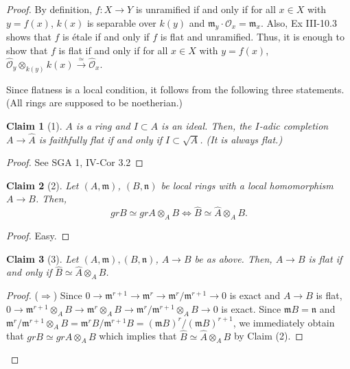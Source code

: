 \documentclass[11pt]{amsart}          %
\newcommand{\calO}{\mathcal{O}}
\newtheorem*{claim}{Claim}
\begin{document}
\begin{proof}By definition, $f : X \to Y$ is unramified if and only if for all $x \in X$ with $y = f(x)$, $k(x)$ is separable over $k(y)$ and $\mathfrak{m}_y \cdot \calO_x = \mathfrak{m}_x$. Also, Ex III-10.3 shows that $f$ is \'etale if and only if $f$ is flat and unramified. Thus, it is enough to show that $f$ is flat if and only if for all $x \in X$ with $ y = f(x)$, $\widehat{\calO}_y \otimes_{k(y)} k(x) \overset{\simeq}{\to} \widehat{\calO}_x.$

Since flatness is a local condition, it follows from the following three statements. (All rings are supposed to be noetherian.)

\begin{claim}[1]$A$ is a ring and $I \subset A$ is an ideal. Then, the $I$-adic completion $A \to \widehat{A}$ is faithfully flat if and only if $I \subset \sqrt{A}$. (It is always flat.)
\end{claim}

\begin{proof}See SGA 1, IV-Cor 3.2
\end{proof}

\begin{claim}[2]Let $(A, \mathfrak{m})$, $(B, \mathfrak{n})$ be local rings with a local homomorphism $A \to B$. Then, 
$$gr B \simeq gr A \otimes_A B \Leftrightarrow \widehat{B} \simeq \widehat{A} \otimes_A B.$$
\end{claim}

\begin{proof}Easy.
\end{proof}

\begin{claim}[3]Let $(A,\mathfrak{m}), (B, \mathfrak{n})$, $A \to B$ be as above. Then, $A \to B$ is flat if and only if $\widehat{B} \simeq \widehat{A} \otimes_A B$.
\end{claim}

\begin{proof}($\Rightarrow$) Since $0 \to \mathfrak{m} ^{r+1} \to \mathfrak{m} ^r \to \mathfrak{m} ^r / \mathfrak{m} ^{r+1} \to 0$ is exact and $A \to B$ is flat, $0 \to \mathfrak{m} ^{r+1} \otimes_A B \to \mathfrak{m} ^r \otimes_A B \to \mathfrak{m} ^r / \mathfrak{m} ^{r+1} \otimes _A B \to 0$ is exact. Since $\mathfrak{m} B = \mathfrak{n}$ and $\mathfrak{m} ^r / \mathfrak{m} ^{r+1} \otimes_A B = \mathfrak{m} ^r B / \mathfrak{m} ^{r+1} B = (\mathfrak{m} B)^r / (\mathfrak{m} B)^{r+1}$, we immediately obtain that $gr B \simeq gr A \otimes_A B$ which implies that $\widehat{B} \simeq \widehat{A} \otimes_A B$ by Claim (2).


\end{proof}
\end{proof}
\end{document}
